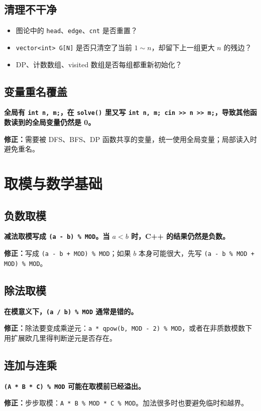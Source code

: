 \documentclass[UTF8,openany,oneside,zihao=-4]{ctexbook}
\newcommand{\risk}[1]{%
  \vspace{0.35em}
  \noindent\colorbox{softred}{%
    \parbox{\dimexpr\linewidth-2\fboxsep}{\textcolor{danger}{\textbf{#1}}}}%
  \vspace{0.35em}
}
\newcommand{\fix}[1]{%
  \vspace{0.35em}
  \noindent\colorbox{softgreen}{%
    \parbox{\dimexpr\linewidth-2\fboxsep}{\textbf{修正：}#1}}%
  \vspace{0.35em}
}
\begin{document}
\subsection{清理不干净}
\begin{itemize}
  \item 图论中的 \lstinline!head!、\lstinline!edge!、\lstinline!cnt! 是否重置？
  \item \lstinline!vector<int> G[N]! 是否只清空了当前 $1\sim n$，却留下上一组更大 $n$ 的残边？
  \item DP、计数数组、visited 数组是否每组都重新初始化？
\end{itemize}

\subsection{变量重名覆盖}
\risk{全局有 \texttt{int n, m;}，在 \texttt{solve()} 里又写 \texttt{int n, m; cin >> n >> m;}，导致其他函数读到的全局变量仍然是 0。}

\fix{需要被 DFS、BFS、DP 函数共享的变量，统一使用全局变量；局部读入时避免重名。}

\section{取模与数学基础}

\subsection{负数取模}
\risk{减法取模写成 \texttt{(a - b) \% MOD}。当 $a<b$ 时，C++ 的结果仍然是负数。}

\fix{写成 \texttt{(a - b + MOD) \% MOD}；如果 $b$ 本身可能很大，先写 \texttt{(a - b \% MOD + MOD) \% MOD}。}

\subsection{除法取模}
\risk{在模意义下，\texttt{(a / b) \% MOD} 通常是错的。}

\fix{除法要变成乘逆元：\texttt{a * qpow(b, MOD - 2) \% MOD}，或者在非质数模数下用扩展欧几里得判断逆元是否存在。}

\subsection{连加与连乘}
\risk{\texttt{(A * B * C) \% MOD} 可能在取模前已经溢出。}

\fix{步步取模：\texttt{A * B \% MOD * C \% MOD}。加法很多时也要避免临时和越界。}
\end{document}
